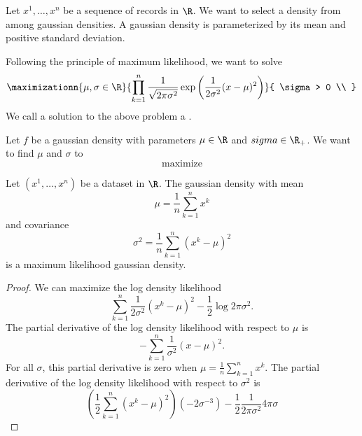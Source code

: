 


Let $x^1, \dots, x^n$ be a sequence
of records in $\R$.
We want to select a density from
among gaussian densities.
A gaussian density is parameterized
by its mean and positive standard deviation.

Following the principle of maximum likelihood,
we want to solve
\[
  \maximizationn{\mu,\sigma \in \R}{
    \prod_{k = 1}^{n}  \frac{1}{\sqrt{2\pi\sigma^2}} \exp \left(\frac{1}{2\sigma^2} (x - \mu)^2 \right)
  }{
    \sigma > 0 \\
  }
\]
We call a solution to the above problem
a .

Let $f$ be a gaussian density with
parameters $\mu \in \R$ and $sigma \in \R_+$.
We want to find $\mu$ and $\sigma$ to
\[
  \text{maximize}
\]


\begin{prop}
Let $(x^1, \dots, x^n)$ be a dataset in $\R$.
The gaussian density with mean
\[
  \mu = \frac{1}{n} \sum_{k = 1}^{n} x^k
\]
and covariance
\[
  \sigma^2 = \frac{1}{n} \sum_{k = 1}^{n} (x^k - \mu)^2
\]
is a maximum likelihood gaussian density.
\begin{proof}
  We can maximize the log density likelihood
  \[
    \sum_{k = 1}^{n} \frac{1}{2\sigma^2}(x^k - \mu)^2 - \frac{1}{2}\log2\pi\sigma^2.
  \]
  The partial derivative of the log density likelihood with
  respect to $\mu$ is
  \[
    - \sum_{k = 1}^{n} \frac{1}{\sigma^2}(x - \mu)^2.
  \]
  For all $\sigma$, this partial derivative is zero
  when $\mu = \frac{1}{n} \sum_{k = 1}^{n} x^k$.
  The partial derivative of the log density likelihood with
  respect to $\sigma^2$ is
  \[
    \left(\frac{1}{2}\sum_{k = 1}^{n}(x^k - \mu)^2\right)(-2 \sigma^{-3}) - \frac{1}{2} \frac{1}{2\pi \sigma^2} 4\pi\sigma
  \]
\end{proof}
\end{prop}
